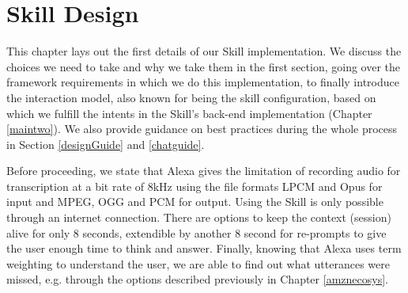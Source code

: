 \chapter{Skill Design} %
\label{mainone}




This chapter lays out the first details of our Skill implementation. We discuss the choices we need to take and why we take them in the first section, going over the framework requirements in which we do this implementation, to finally introduce the interaction model, also known for being the skill configuration, based on which we fulfill the intents in the Skill's back-end implementation (Chapter \ref{maintwo}). We also provide guidance on best practices during the whole process in Section \ref{designGuide} and \ref{chatguide}.

Before proceeding, we state that Alexa gives the limitation of recording audio for transcription at a bit rate of 8kHz using the file formats LPCM and Opus for input and MPEG, OGG and PCM for output. Using the Skill is only possible through an internet connection. There are options to keep the context (session) alive for only 8 seconds, extendible by another 8 second for re-prompts to give the user enough time to think and answer. Finally, knowing that Alexa uses term weighting to understand the user, we are able to find out what utterances were missed, e.g. through the options described previously in Chapter \ref{amznecosys}. 


%

%
%





